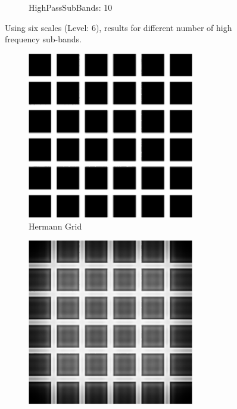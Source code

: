 \begin{figure}[H]
\begin{subfigure}[t]{.333\textwidth}
    \captionsetup{width=\textwidth}
    \caption{HighPassSubBands: 10}
    \label{fig:phase_bands610}
  \end{subfigure}
  \caption{Using six scales (Level: 6), results for different number of high frequency sub-bands.}
  \label{fig:phase_bands}
\end{figure}
\begin{figure}[H]
  \centering
  \begin{subfigure}[t]{0.4\textwidth}
    \centering
    \includegraphics[width=0.8\textwidth]{Figures/chapter-wavelets/images/phaseImages/hermann_original.png}
    \captionsetup{width=\textwidth}
    \caption{Hermann Grid}
    \label{fig:hermann_original}
  \end{subfigure}
  \vspace*{\floatsep}
  \begin{subfigure}[t]{.4\textwidth}
    \centering
    \includegraphics[width=0.8\textwidth]{Figures/chapter-wavelets/images/phaseImages/hermann_simoncelli_8_1.png}

\end{subfigure}
\end{figure}
